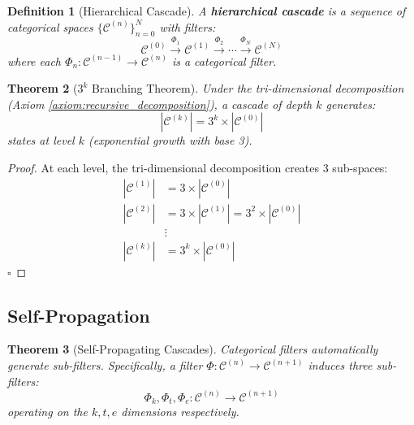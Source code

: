 \documentclass[12pt,a4paper]{article}
\newtheorem{theorem}{Theorem}[section]
\newtheorem{definition}[theorem]{Definition}
\begin{document}
\begin{definition}[Hierarchical Cascade]
\label{def:hierarchical_cascade}
A \textbf{hierarchical cascade} is a sequence of categorical spaces $\{\mathcal{C}^{(n)}\}_{n=0}^{N}$ with filters:
\begin{equation}
\mathcal{C}^{(0)} \xrightarrow{\Phi_1} \mathcal{C}^{(1)} \xrightarrow{\Phi_2} \cdots \xrightarrow{\Phi_N} \mathcal{C}^{(N)}
\end{equation}
where each $\Phi_n: \mathcal{C}^{(n-1)} \to \mathcal{C}^{(n)}$ is a categorical filter.
\end{definition}

\begin{theorem}[$3^k$ Branching Theorem]
\label{thm:3k_branching}
Under the tri-dimensional decomposition (Axiom \ref{axiom:recursive_decomposition}), a cascade of depth $k$ generates:
\begin{equation}
|\mathcal{C}^{(k)}| = 3^k \times |\mathcal{C}^{(0)}|
\end{equation}
states at level $k$ (exponential growth with base 3).
\end{theorem}

\begin{proof}
At each level, the tri-dimensional decomposition creates 3 sub-spaces:
\begin{align}
|\mathcal{C}^{(1)}| &= 3 \times |\mathcal{C}^{(0)}| \\
|\mathcal{C}^{(2)}| &= 3 \times |\mathcal{C}^{(1)}| = 3^2 \times |\mathcal{C}^{(0)}| \\
&\vdots \\
|\mathcal{C}^{(k)}| &= 3^k \times |\mathcal{C}^{(0)}|
\end{align}
$\square$
\end{proof}

\subsection{Self-Propagation}

\begin{theorem}[Self-Propagating Cascades]
\label{thm:self_propagation}
Categorical filters automatically generate sub-filters. Specifically, a filter $\Phi: \mathcal{C}^{(n)} \to \mathcal{C}^{(n+1)}$ induces three sub-filters:
\begin{equation}
\Phi_k, \Phi_t, \Phi_e: \mathcal{C}^{(n)} \to \mathcal{C}^{(n+1)}
\end{equation}
operating on the $k, t, e$ dimensions respectively.
\end{theorem}
\end{document}
